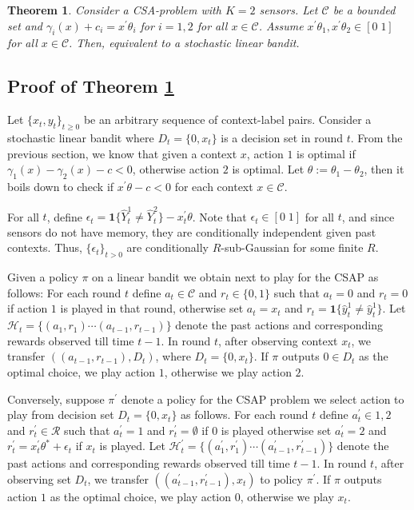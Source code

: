 \documentclass{article}
\newtheorem{thm}{Theorem}
\begin{document}
\begin{thm}
	\label{thm:2CSAPRegret}
	Consider a CSA-problem with $K=2$ sensors. Let $\mathcal{C}$ be a bounded set and $\gamma_i(x)+c_i=x^\prime\theta_i$ for $i=1,2$ for all $x \in \mathcal{C}$. Assume $x^\prime \theta_1, x^\prime \theta_2 \in [0\; 1]$ for all $x \in \mathcal{C}$. Then, equivalent to a stochastic linear bandit. 
\end{thm}


\subsection{Proof of Theorem \ref{thm:2CSAPRegret}}
Let $\{x_t,y_t\}_{t\geq 0}$ be an arbitrary sequence of context-label pairs. Consider a stochastic linear bandit where $D_t=\{0, x_t\} $ is a decision set in round $t$. 
From the previous section, we know that given a context $x$, action $1$ is optimal if $\gamma_1(x)-\gamma_2(x) -c< 0$, otherwise  action $2$ is optimal. Let $\theta:=\theta_1-\theta_2$, then it boils down to check if $x^\prime\theta-c<0$ for each context $x\in \mathcal{C}$. 

For all $t$, define $\epsilon_t= \boldsymbol{1}\{\hat{Y}^1_t \neq \hat{Y}^2_t\}-x_t^\prime\theta$. Note that $\epsilon_t \in [0 \;1]$ for all $t$, and since sensors do not have memory, they are conditionally independent given past contexts. Thus, $\{\epsilon_t\}_{t>0}$ are conditionally $R$-sub-Gaussian for some finite $R$.  

Given a policy $\pi$ on a linear bandit we obtain next to play for the CSAP as follows: For each round $t$ define $a_t \in \mathcal{C}$ and $r_t \in \{0,1\}$ such that $a_t=0$ and $r_t=0$ if action $1$ is played in that round, otherwise set $a_t=x_t$ and $r_t=\boldsymbol{1}\{\hat{y}^1_t \neq \hat{y}^1_t \}$. Let $\mathcal{H}_{t}=\{(a_1, r_1)\cdots (a_{t-1},r_{t-1})\}$ denote the past actions and corresponding rewards observed till time $t-1$. In round $t$, after observing context $x_t$, we transfer  $((a_{t-1},r_{t-1}), D_t)$, where  $D_t=\{0,x_t\}$. If $\pi$ outputs $0 \in D_t$ as the optimal choice, we play action $1$, otherwise we play action $2$.

Conversely,   suppose $\pi^\prime$ denote a policy for the CSAP problem we select action to play from decision set $D_t=\{0,x_t\}$ as follows.  For each round $t$ define $a^\prime_t \in {1,2}$ and $r^\prime_t \in \mathcal{R}$ such that $a^\prime_t=1$ and $r^\prime_t=\emptyset$ if $0$ is played otherwise set $a^\prime_t=2$ and $r^\prime_t=x_t^\prime\theta^* +\epsilon_t$ if $x_t$ is played.  Let $\mathcal{H}^\prime_{t}=\{(a^\prime_1, r^\prime_1)\cdots (a^\prime_{t-1},r^\prime_{t-1})\}$ denote the past actions and corresponding rewards observed till time $t-1$. In round $t$, after observing set  $D_t$, we transfer  $((a^\prime_{t-1},r^\prime_{t-1}), x_t)$ to policy $\pi^\prime$. If $\pi$ outputs action $1$ as the optimal choice, we play action $0$, otherwise we play $x_t$. 
\end{document}
